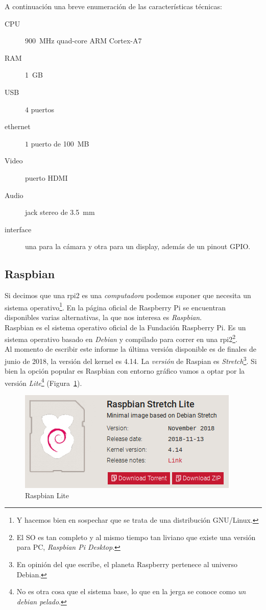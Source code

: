 \documentclass[10pt,a4paper]{article}
\begin{document}
A continuaci\'on una breve enumeraci\'on de las caracter\'isticas t\'ecnicas:

\begin{description}
    \item [CPU] \SI{900}{MHz} quad-core ARM Cortex-A7
    \item [RAM] \SI{1}{GB}
    \item [USB] $4$ puertos
    \item [ethernet] $1$ puerto de \SI{100}{MB}
    \item [Video] puerto HDMI
    \item [Audio] jack stereo de \SI{3,5}{mm}
    \item [interface] una para la c\'amara y otra para un display, adem\'as de un pinout GPIO.
\end{description}

\subsection{Raspbian}

Si decimos que una rpi2 es una \emph{computadora} podemos suponer que necesita un sistema operativo\footnote{Y hacemos bien en sospechar que se trata de una distribuci\'on GNU/Linux.}. En la p\'agina oficial de Raspberry Pi se encuentran disponibles varias alternativas, la que nos interesa es \emph{Raspbian}.\\

Raspbian es el sistema operativo oficial de la Fundaci\'on Raspberry Pi. Es un sistema operativo basado en \emph{Debian} y compilado para correr en una rpi2\footnote{El SO es tan completo y al mismo tiempo tan liviano que existe una versi\'on para PC, \emph{Raspbian Pi Desktop}.}.\\

Al momento de escribir este informe la \'ultima versi\'on disponible es de finales de junio de 2018, la versi\'on del kernel es 4.14. La \emph{versi\'on} de Raspian es \emph{Stretch}\footnote{En opini\'on del que escribe, el planeta Raspberry pertenece al universo Debian.}. Si bien la opci\'on popular es Raspbian con entorno gr\'afico vamos a optar por la versi\'on \emph{Lite}\footnote{No es otra cosa que el sistema base, lo que en la jerga se conoce como \emph{un debian pelado}.} (Figura~\ref{fig:raspbian}).\\

\begin{figure}
\centering
    \includegraphics[scale=0.5]{pictos/raspbian-lite.png}
    \caption{Raspbian Lite}
    \label{fig:raspbian}
\end{figure}
\end{document}

